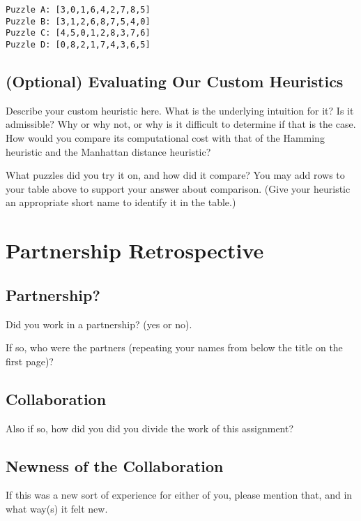 \documentclass{article}
\begin{document}
\begin{verbatim}
Puzzle A: [3,0,1,6,4,2,7,8,5]
Puzzle B: [3,1,2,6,8,7,5,4,0]
Puzzle C: [4,5,0,1,2,8,3,7,6]
Puzzle D: [0,8,2,1,7,4,3,6,5]
\end{verbatim}

\subsection{(Optional) Evaluating Our Custom Heuristics}

Describe your custom heuristic here.  What is the underlying intuition for it?
Is it admissible? Why or why not, or why is it difficult to determine if that
is the case.  How would you compare its computational cost with that of
the Hamming heuristic and the Manhattan distance heuristic?

What puzzles did you try it on, and how did it compare?
You may add rows to your table above to support your answer about comparison.
(Give your heuristic an appropriate short name to identify it in the table.)

\newpage
\section{Partnership Retrospective}

\subsection{Partnership?}
Did you work in a partnership? (yes or no).

If so, who were the partners (repeating your names from below the title on the first page)?

\subsection{Collaboration}
Also if so, how did you did you divide the work of this assignment?

\subsection{Newness of the Collaboration}
If this was a new sort of experience for either of you, please mention that,
and in what way(s) it felt new.
\end{document}
